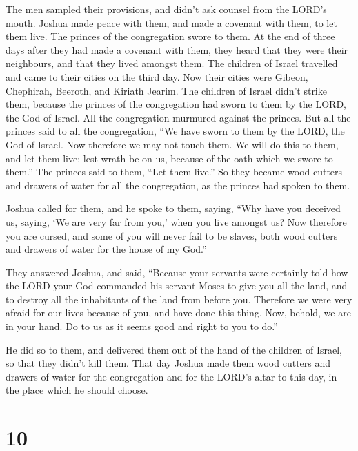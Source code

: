  The men sampled their provisions, and didn't ask counsel
from the LORD's mouth.  Joshua made peace with them, and
made a covenant with them, to let them live. The princes of the
congregation swore to them.  At the end of three days after
they had made a covenant with them, they heard that they were their
neighbours, and that they lived amongst them.  The children
of Israel travelled and came to their cities on the third day. Now their
cities were Gibeon, Chephirah, Beeroth, and Kiriath Jearim.
 The children of Israel didn't strike them, because the
princes of the congregation had sworn to them by the LORD, the God of
Israel. All the congregation murmured against the princes. 
But all the princes said to all the congregation, ``We have sworn to
them by the LORD, the God of Israel. Now therefore we may not touch
them.  We will do this to them, and let them live; lest
wrath be on us, because of the oath which we swore to them.''
 The princes said to them, ``Let them live.'' So they
became wood cutters and drawers of water for all the congregation, as
the princes had spoken to them.

 Joshua called for them, and he spoke to them, saying,
``Why have you deceived us, saying, `We are very far from you,' when you
live amongst us?  Now therefore you are cursed, and some of
you will never fail to be slaves, both wood cutters and drawers of water
for the house of my God.''

 They answered Joshua, and said, ``Because your servants
were certainly told how the LORD your God commanded his servant Moses to
give you all the land, and to destroy all the inhabitants of the land
from before you. Therefore we were very afraid for our lives because of
you, and have done this thing.  Now, behold, we are in your
hand. Do to us as it seems good and right to you to do.''

 He did so to them, and delivered them out of the hand of
the children of Israel, so that they didn't kill them. 
That day Joshua made them wood cutters and drawers of water for the
congregation and for the LORD's altar to this day, in the place which he
should choose.

\hypertarget{section-9}{%
\section{10}\label{section-9}}

